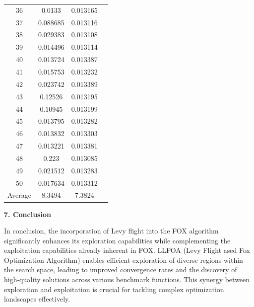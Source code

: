 \documentclass[
]{article}
\begin{document}
\begin{justify}
{\begin{table}[htbp]
\begin{tabular}{cccc}
36 & 0.0133 & 0.013165 \\
37 & 0.088685 & 0.013116 \\
38 & 0.029383 & 0.013108 \\
39 & 0.014496 & 0.013114 \\
40 & 0.013724 & 0.013387 \\
41 & 0.015753 & 0.013232 \\
42 & 0.023742 & 0.013389 \\
43 & 0.12526 & 0.013195 \\
44 & 0.10945 & 0.013199 \\
45 & 0.013795 & 0.013282 \\
46 & 0.013832 & 0.013303 \\
47 & 0.013221 & 0.013381 \\
48 & 0.223 & 0.013085 \\
49 & 0.021512 & 0.013283 \\
50 & 0.017634 & 0.013312 \\
\midrule
Average & 8.3494 & 7.3824 \\
\bottomrule
\end{tabular}
\end{table}

\newpage
\textbf{7. Conclusion}

\vspace{1mm}

In conclusion, the incorporation of Levy flight into the FOX algorithm significantly enhances its exploration capabilities while complementing the exploitation capabilities already inherent in FOX. LLFOA (Levy Flight ased Fox Optimization Algorithm) enables efficient exploration of diverse regions within the search space, leading to improved convergence rates and the discovery of high-quality solutions across various benchmark functions. This synergy between exploration and exploitation is crucial for tackling complex optimization landscapes effectively.

}
\end{justify}
\end{document}
